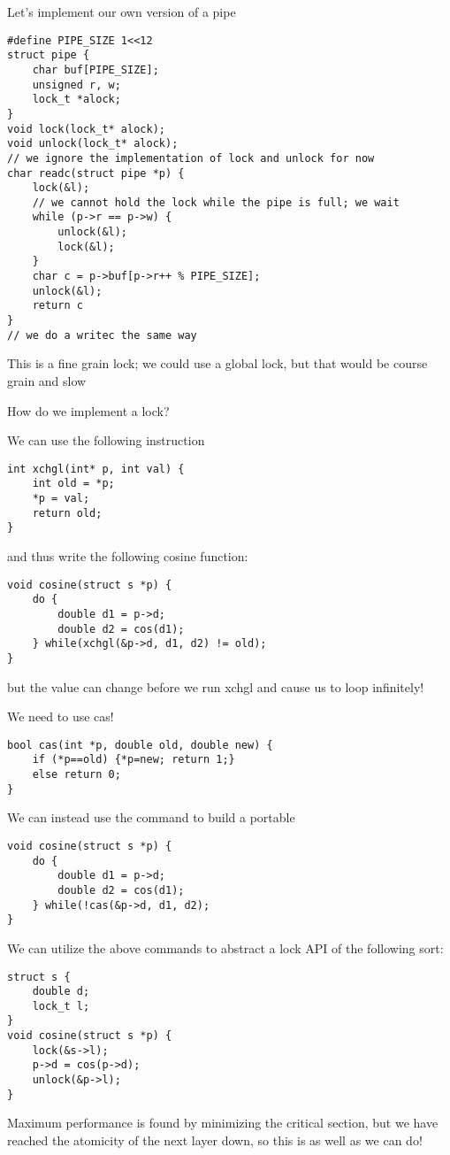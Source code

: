 \documentclass[../../lecture_notes.tex]{subfiles}
\begin{document}
Let’s implement our own version of a pipe
\begin{lstlisting}
#define PIPE_SIZE 1<<12
struct pipe {
	char buf[PIPE_SIZE];
	unsigned r, w;
	lock_t *alock;
}
void lock(lock_t* alock);
void unlock(lock_t* alock);
// we ignore the implementation of lock and unlock for now
char readc(struct pipe *p) {
	lock(&l);
	// we cannot hold the lock while the pipe is full; we wait
	while (p->r == p->w) {
		unlock(&l);
		lock(&l);
	}
	char c = p->buf[p->r++ % PIPE_SIZE];
	unlock(&l);
	return c
}
// we do a writec the same way
\end{lstlisting}


This is a fine grain lock; we could use a global lock, but that would be course grain and slow

How do we implement a lock?

We can use the following instruction
\begin{lstlisting}
int xchgl(int* p, int val) {
	int old = *p;
	*p = val;
	return old;
}
\end{lstlisting}

and thus write the following cosine function:
\begin{lstlisting}
void cosine(struct s *p) {
	do {
		double d1 = p->d;
		double d2 = cos(d1);
	} while(xchgl(&p->d, d1, d2) != old);
}
\end{lstlisting}
but the value can change before we run xchgl and cause us to loop infinitely!

We need to use cas!
\begin{lstlisting}
bool cas(int *p, double old, double new) {
	if (*p==old) {*p=new; return 1;}
	else return 0;
}
\end{lstlisting}


We can instead use the command to build a portable 
\begin{lstlisting}
void cosine(struct s *p) {
	do {
		double d1 = p->d;
		double d2 = cos(d1);
	} while(!cas(&p->d, d1, d2);
}
\end{lstlisting}

We can utilize the above commands to abstract a lock API of the following sort:
\begin{lstlisting}
struct s {
	double d;
	lock_t l;
}
void cosine(struct s *p) {
	lock(&s->l);
	p->d = cos(p->d);
	unlock(&p->l);
}
\end{lstlisting}

Maximum performance is found by minimizing the critical section, but we have reached the atomicity of the next layer down, so this is as well as we can do!
\end{document}
